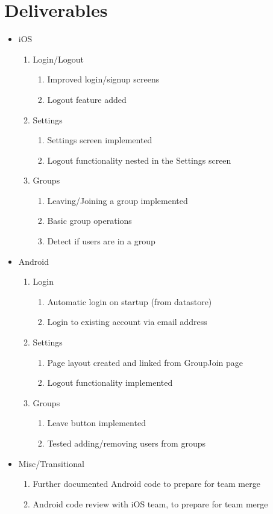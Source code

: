 \documentclass[11pt]{article}
\begin{document}
\section*{Deliverables}
	\begin{itemize}
	\item iOS
		\begin{enumerate}
		\item Login/Logout
			\begin{enumerate}
			\item Improved login/signup screens
			\item Logout feature added
			\end{enumerate}
		\item Settings
			\begin{enumerate}
			\item Settings screen implemented
			\item Logout functionality nested in the Settings screen
			\end{enumerate}
		\item Groups
			\begin{enumerate}
			\item Leaving/Joining a group implemented
			\item Basic group operations
			\item Detect if users are in a group
			\end{enumerate}
		\end{enumerate}
		
	\item Android
		\begin{enumerate}
		\item Login
			\begin{enumerate}
			\item Automatic login on startup (from datastore)
			\item Login to existing account via email address
			\end{enumerate}
		\item Settings
			\begin{enumerate}
			\item Page layout created and linked from GroupJoin page
			\item Logout functionality implemented
			\end{enumerate}
		\item Groups
			\begin{enumerate}
			\item Leave button implemented
			\item Tested adding/removing users from groups
			\end{enumerate}
		\end{enumerate}

	\item Misc/Transitional
		\begin{enumerate}
			\item Further documented Android code to prepare for team merge
			\item Android code review with iOS team, to prepare for team merge
		\end{enumerate}

	\end{itemize}
\end{document}
